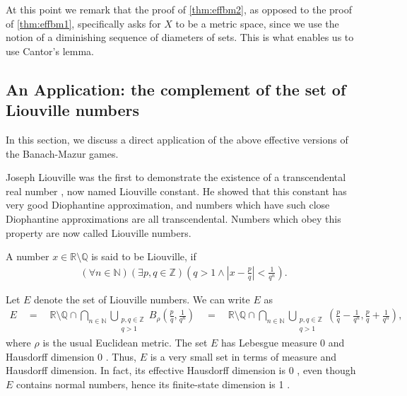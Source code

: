 \documentclass[a4paper,UKenglish,autoref,thm-restate,numberwithinsect]{lipics-v2021}
\newcommand{\N}{\mathbb{N}}
\begin{document}
At this point we remark that the proof of \cref{thm:effbm2}, as opposed to the proof of \cref{thm:effbm1}, specifically asks for $X$ to be a metric space, since we use the notion of a diminishing sequence of diameters of sets. This is what enables us to use Cantor's lemma.

\subsection{An Application: the complement of the set of Liouville
  numbers}
In this section, we discuss a direct application of the above effective
versions of the Banach-Mazur games.


Joseph Liouville was the first to demonstrate the existence of a
transcendental real number \cite{Liouville1844}, now named Liouville
constant. He showed that this constant has very good Diophantine
approximation, and numbers which have such close Diophantine
approximations are all transcendental. Numbers which obey this
property are now called Liouville numbers.

\begin{definition}
  A number $x\in\mathbb{R}\setminus\mathbb{Q}$ is said to be Liouville, if 
  \begin{align*}
    (\forall n\in\mathbb{N})(\exists p,q\in\mathbb{Z})
    \left(q>1 \wedge \left|x-\frac{p}{q}\right| <\frac{1}{q^n} \right). 
  \end{align*}
\end{definition}

     
Let $E$ denote the set of Liouville numbers. We can write $E$ as 
\begin{align*}
  E \quad=\quad
  \mathbb{R}\setminus\mathbb{Q} \cap
  \bigcap_{n\in\N}\bigcup_{\substack{p,q\in\mathbb{Z}\\q>1}}
  B_\rho\left(\frac{p}{q},\frac{1}{q^n}\right)
  \quad=\quad
  \mathbb{R}\setminus\mathbb{Q}\cap
  \bigcap_{n\in\N}\bigcup_{\substack{p,q\in\mathbb{Z}\\q>1}}
  \left(\frac{p}{q}-\frac{1}{q^n},\frac{p}{q}+\frac{1}{q^n}\right), 
\end{align*}
where $\rho$ is the usual Euclidean metric. The set $E$ has Lebesgue
measure 0 and Hausdorff dimension 0 \cite{Oxtoby1980}. Thus, $E$ is a
very small set in terms of measure and Hausdorff dimension. In fact,
its effective Hausdorff dimension is 0 \cite{Staiger2002}, even though
$E$ contains normal numbers, hence its finite-state dimension is 1
\cite{Kano1993,Nandakumar2016}.
\end{document}
